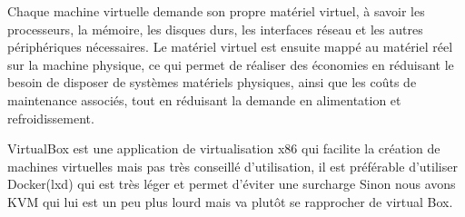  Chaque machine virtuelle demande son propre matériel virtuel, à savoir les processeurs, la mémoire, les disques durs,
  les interfaces réseau et les autres périphériques nécessaires. Le matériel virtuel est ensuite mappé au matériel réel
   sur la machine physique, ce qui permet de réaliser des économies en réduisant le besoin de disposer de systèmes matériels physiques,
    ainsi que les coûts de maintenance associés, tout en réduisant la demande en alimentation et refroidissement.


VirtualBox est une application de virtualisation x86 qui facilite la création de machines virtuelles mais pas très conseillé
d’utilisation, il est préférable d'utiliser Docker(lxd) qui est très léger et permet d'éviter une surcharge
Sinon nous avons KVM qui lui est un peu plus lourd mais va plutôt se rapprocher de virtual Box.
